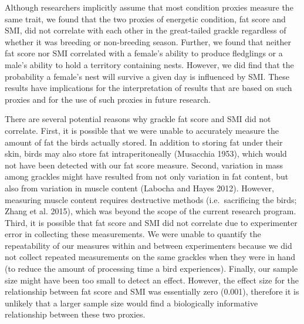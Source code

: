 \documentclass[
]{article}
\begin{document}
Although researchers implicitly assume that most condition proxies
measure the same trait, we found that the two proxies of energetic
condition, fat score and SMI, did not correlate with each other in the
great-tailed grackle regardless of whether it was breeding or
non-breeding season. Further, we found that neither fat score nor SMI
correlated with a female's ability to produce fledglings or a male's
ability to hold a territory containing nests. However, we did find that
the probability a female's nest will survive a given day is influenced
by SMI. These results have implications for the interpretation of
results that are based on such proxies and for the use of such proxies
in future research.

There are several potential reasons why grackle fat score and SMI did
not correlate. First, it is possible that we were unable to accurately
measure the amount of fat the birds actually stored. In addition to
storing fat under their skin, birds may also store fat intraperitoneally
(Musacchia 1953), which would not have been detected with our fat score
measure. Second, variation in mass among grackles might have resulted
from not only variation in fat content, but also from variation in
muscle content (Labocha and Hayes 2012). However, measuring muscle
content requires destructive methods (i.e.~sacrificing the birds; Zhang
et al. 2015), which was beyond the scope of the current research
program. Third, it is possible that fat score and SMI did not correlate
due to experimenter error in collecting these measurements. We were
unable to quantify the repeatability of our measures within and between
experimenters because we did not collect repeated measurements on the
same grackles when they were in hand (to reduce the amount of processing
time a bird experiences). Finally, our sample size might have been too
small to detect an effect. However, the effect size for the relationship
between fat score and SMI was essentially zero (0.001), therefore it is
unlikely that a larger sample size would find a biologically informative
relationship between these two proxies.
\end{document}
